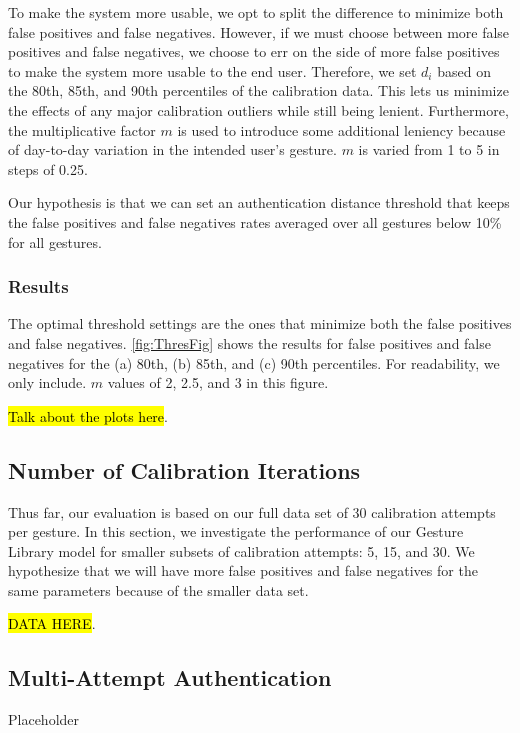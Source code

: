 To make the system more usable, we opt to split the difference to minimize both false positives and false negatives. However, if we must choose between more false positives and false negatives, we choose to err on the side of more false positives to make the system more usable to the end user. Therefore, we set $d_{i}$ based on the 80th, 85th, and 90th percentiles of the calibration data. This lets us minimize the effects of any major calibration outliers while still being lenient. Furthermore, the multiplicative factor $m$ is used to introduce some additional leniency because of day-to-day variation in the intended user's gesture. $m$ is varied from 1 to 5 in steps of 0.25.

Our hypothesis is that we can set an authentication distance threshold that keeps the false positives and false negatives rates averaged over all gestures below 10\% for all gestures.

\subsubsection{Results}

The optimal threshold settings are the ones that minimize both the false positives and false negatives. \autoref{fig:ThresFig} shows the results for false positives and false negatives for the (a) 80th, (b) 85th, and (c) 90th percentiles. For readability, we only include. $m$ values of 2, 2.5, and 3 in this figure.

\hl{Talk about the plots here}.

\subsection{Number of Calibration Iterations}

Thus far, our evaluation is based on our full data set of 30 calibration attempts per gesture. In this section, we investigate the performance of our Gesture Library model for smaller subsets of calibration attempts: 5, 15, and 30. We hypothesize that we will have more false positives and false negatives for the same parameters because of the smaller data set.

\hl{DATA HERE}.

\subsection{Multi-Attempt Authentication}

Placeholder

 

